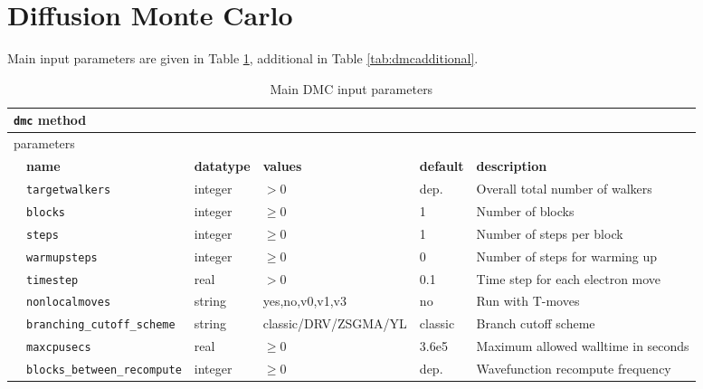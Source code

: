 \section{Diffusion Monte Carlo}\label{sec:dmc}
Main input parameters are given in Table \ref{tab:dmcmain}, additional in Table \ref{tab:dmcadditional}.
\begin{table}[h]
\begin{center}
  \caption{Main DMC input parameters}
  \label{tab:dmcmain}
\begin{tabularx}{\textwidth}{l l l l l X }
\hline
\multicolumn{6}{l}{\texttt{dmc} method} \\
\hline
\multicolumn{2}{l}{parameters}  & \multicolumn{4}{l}{}\\
   &   \bfseries name     & \bfseries datatype & \bfseries values & \bfseries default   & \bfseries description \\
   &   \texttt{targetwalkers       } &  integer  & $> 0$ & dep.   & Overall total number of walkers \\
   &   \texttt{blocks              } &  integer  & $\ge 0$ & 1   & Number of blocks \\
   &   \texttt{steps               } &  integer  & $\ge 0$ & 1   & Number of steps per block\\
   &   \texttt{warmupsteps         } &  integer  & $\ge 0$ & 0   & Number of steps for warming up\\
   &   \texttt{timestep            } &  real     & $> 0$   & 0.1 & Time step for each electron move \\
   &   \texttt{nonlocalmoves       } &  string   & yes,no,v0,v1,v3 & no   & Run with T-moves  \\
   &   \texttt{branching\_cutoff\_scheme} & string    & classic/DRV/ZSGMA/YL & classic & Branch cutoff scheme \\
   &   \texttt{maxcpusecs          } &  real     & $\ge 0$ & 3.6e5   & Maximum allowed walltime in seconds \\
   &   \texttt{blocks\_between\_recompute} &  integer  & $\ge 0$ & dep.  & Wavefunction recompute frequency  \\
   \hline
  \end{tabularx}
  \end{center}
  \end{table}

